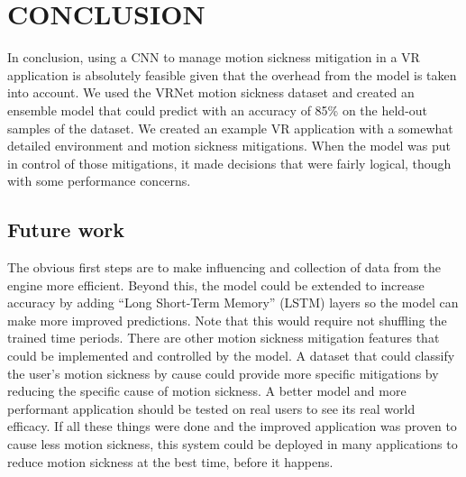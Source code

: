 \chapter{CONCLUSION}
\label{ch:conclusion}

In conclusion, using a CNN to manage motion sickness mitigation in a VR application is absolutely feasible given that the overhead from the model is taken into account.
We used the VRNet motion sickness dataset and created an ensemble model that could predict with an accuracy of 85\% on the held-out samples of the dataset.
We created an example VR application with a somewhat detailed environment and motion sickness mitigations.
When the model was put in control of those mitigations, it made decisions that were fairly logical, though with some performance concerns.

\section{Future work}
\label{sec:future_work}
The obvious first steps are to make influencing and collection of data from the engine more efficient.
Beyond this, the model could be extended to increase accuracy by adding ``Long Short-Term Memory'' (LSTM) layers so the model can make more improved predictions.
Note that this would require not shuffling the trained time periods.
There are other motion sickness mitigation features that could be implemented and controlled by the model.
A dataset that could classify the user's motion sickness by cause could provide more specific mitigations by reducing the specific cause of motion sickness.
A better model and more performant application should be tested on real users to see its real world efficacy.
If all these things were done and the improved application was proven to cause less motion sickness, this system could be deployed in many applications to reduce motion sickness at the best time, before it happens.






